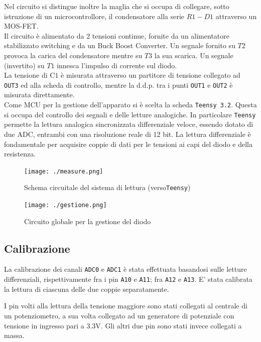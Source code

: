\documentclass{article}[a4paper, oneside, 11pt]
\begin{document}
Nel circuito si distingue inoltre la maglia che si occupa di collegare, sotto
istruzione di un microcontrollore, il condensatore alla serie $R1-D1$
attraverso un MOS-FET.\\
Il circuito \`e alimentato da 2 tensioni continue, fornite da un alimentatore
stabilizzato switching e da un Buck Boost Converter.
Un segnale fornito su $T2$ provoca la carica del condensatore mentre su $T3$
la sua scarica. Un segnale (invertito) su $T1$ innesca l'impulso di corrente
sul diodo.\\
La tensione di C$1$ \`e misurata attraverso un partitore di tensione collegato 
ad \verb+OUT3+ ed alla scheda di controllo, mentre la d.d.p. tra i punti
\verb+OUT1+ e \verb+OUT2+ \`e misurata direttamente.\\
Come MCU per la gestione dell'apparato si \`e scelta la scheda 
\verb+Teensy 3.2+\cite{teensy}. Questa si occupa del controllo dei segnali e 
delle letture analogiche. In particolare \verb+Teensy+ permette la lettura
analogica sincronizzata differenziale veloce, essendo dotato di due ADC,
entrambi con una risoluzione reale di 12 bit. La lettura differenziale \`e
fondamentale per acquisire coppie di dati per le tensioni ai capi del diodo
e della resistenza.

\begin{figure}[!htb]
\centering 
	\texttt{[image: ./measure.png]}
\caption{Schema circuitale del sistema di lettura (verso\texttt{Teensy})
\label{sch:rdng}}
\end{figure}

\begin{figure}[h!t]
\centering 
	\texttt{[image: ./gestione.png]}
\caption{Circuito globale per la gestione del diodo \label{sch:gest}}
\end{figure}

\subsection{Calibrazione}\label{sec: cal}

La calibrazione dei canali \verb+ADC0+ e \verb+ADC1+ \`e stata effettuata
basandosi sulle letture differenziali, rispettivamente fra i pin \verb+A10+
e \verb+A11+; fra \verb+A12+ e \verb+A13+. E’ stata calibrata la lettura
di ciascuna delle due coppie separatamente.

I pin volti alla lettura della tensione maggiore sono stati collegati al 
centrale di un potenziometro, a sua volta collegato ad un generatore di 
potenziale con tensione in ingresso pari a $3.3\si{\V}$. Gli altri due pin
sono stati invece collegati a massa.
\end{document}
